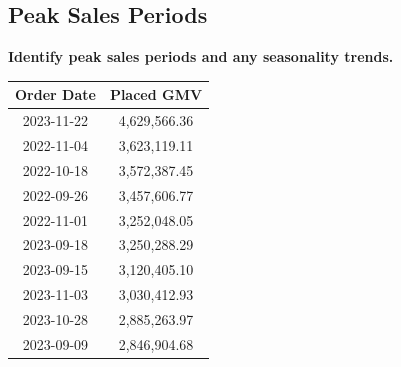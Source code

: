 \documentclass{article}
\begin{document}
\subsection{Peak Sales Periods}
\textbf{Identify peak sales periods and any seasonality trends.}
\begin{tcolorbox}[colback=purple!5!white, colframe=purple!75!black, fonttitle=\bfseries, title=Peak Sales Periods by Days]
    \centering
    \begin{tabular}{|c|c|}
    \hline
    \textbf{Order Date} & \textbf{Placed GMV} \\ \hline
    2023-11-22 & 4,629,566.36 \\ \hline 
    2022-11-04 & 3,623,119.11 \\ \hline 
    2022-10-18 & 3,572,387.45 \\ \hline   
    2022-09-26 & 3,457,606.77 \\ \hline 
    2022-11-01 & 3,252,048.05 \\ \hline  
    2023-09-18 & 3,250,288.29 \\ \hline 
    2023-09-15 & 3,120,405.10 \\ \hline 
    2023-11-03 & 3,030,412.93 \\ \hline 
    2023-10-28 & 2,885,263.97 \\ \hline 
    2023-09-09 & 2,846,904.68 \\ \hline 
    \end{tabular}
\end{tcolorbox}
\end{document}

